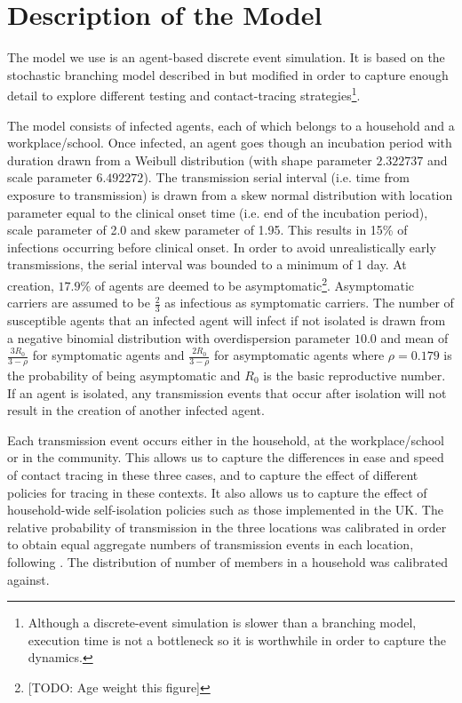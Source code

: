 \documentclass{article}
\begin{document}
\section{Description of the Model}

The model we use is an agent-based discrete event simulation. It is based on the stochastic branching model described in \cite{hellewellfeasibility} but modified in order to capture enough detail to explore different testing and contact-tracing strategies\footnote{Although a discrete-event simulation is slower than a branching model, execution time is not a bottleneck so it is worthwhile in order to capture the dynamics.}.

The model consists of infected agents, each of which belongs to a household and a workplace/school. Once infected, an agent goes though an incubation period with duration drawn from a Weibull distribution (with shape parameter $2.322737$ and scale parameter $6.492272$)\cite{backer2020incubation}. The transmission serial interval (i.e. time from exposure to transmission) is drawn from a skew normal distribution with location parameter equal to the clinical onset time (i.e. end of the incubation period), scale parameter of 2.0 and skew parameter of 1.95\cite{hellewellfeasibility}. This results in 15\% of infections occurring before clinical onset\cite{hellewellfeasibility}. In order to avoid unrealistically early transmissions, the serial interval was bounded to a minimum of 1 day. At creation, $17.9\%$ of agents are deemed to be asymptomatic\cite{:/content/10.2807/1560-7917.ES.2020.25.10.2000180}\footnote{[TODO: Age weight this figure]}. Asymptomatic carriers are assumed to be $\frac{2}{3}$ as infectious as symptomatic carriers\cite{ferguson2020impact}. The number of susceptible agents that an infected agent will infect if not isolated is drawn from a negative binomial distribution with overdispersion parameter $10.0$\cite{zhuang2020preliminary}\cite{riou2020pattern} and mean of $\frac{3R_0}{3 - \rho}$ for symptomatic agents and $\frac{2R_0}{3 - \rho}$ for asymptomatic agents where $\rho=0.179$ is the probability of being asymptomatic and $R_0$ is the basic reproductive number. If an agent is isolated, any transmission events that occur after isolation will not result in the creation of another infected agent.

Each transmission event occurs either in the household, at the workplace/school or in the community. This allows us to capture the differences in ease and speed of contact tracing in these three cases, and to capture the effect of different policies for tracing in these contexts. It also allows us to capture the effect of household-wide self-isolation policies such as those implemented in the UK. The relative probability of transmission in the three locations was calibrated in order to obtain equal aggregate numbers of transmission events in each location, following \cite{ferguson2020impact}. The distribution of number of members in a household was calibrated against\cite{smithHouseholds}.
\end{document}
